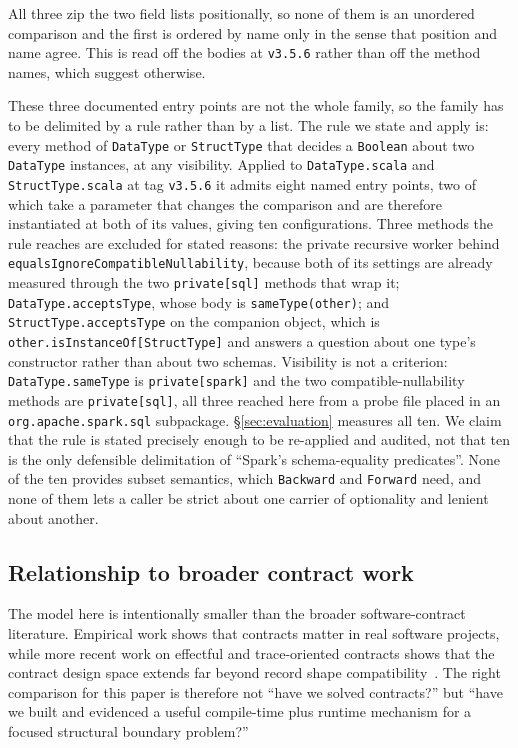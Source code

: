 All three zip the two field lists positionally, so none of them is an unordered comparison and the first is ordered by name only in the sense that position and name agree. This is read off the bodies at \texttt{v3.5.6} rather than off the method names, which suggest otherwise.


These three documented entry points are not the whole family, so the family has to be delimited by a rule rather than by a list. The rule we state and apply is: every method of \texttt{DataType} or \texttt{StructType} that decides a \texttt{Boolean} about two \texttt{DataType} instances, at any visibility. Applied to \texttt{DataType.scala} and \texttt{StructType.scala} at tag \texttt{v3.5.6} it admits eight named entry points, two of which take a parameter that changes the comparison and are therefore instantiated at both of its values, giving ten configurations. Three methods the rule reaches are excluded for stated reasons: the private recursive worker behind \texttt{equals\allowbreak Ignore\allowbreak Compatible\allowbreak Nullability}, because both of its settings are already measured through the two \texttt{private[sql]} methods that wrap it; \texttt{DataType.acceptsType}, whose body is \texttt{sameType(other)}; and \texttt{StructType.acceptsType} on the companion object, which is \texttt{other.isInstanceOf[StructType]} and answers a question about one type's constructor rather than about two schemas. Visibility is not a criterion: \texttt{DataType.sameType} is \texttt{private[spark]} and the two compatible-nullability methods are \texttt{private[sql]}, all three reached here from a probe file placed in an \texttt{org.apache.spark.sql} subpackage. \S\ref{sec:evaluation} measures all ten. We claim that the rule is stated precisely enough to be re-applied and audited, not that ten is the only defensible delimitation of ``Spark's schema-equality predicates''. None of the ten provides subset semantics, which \texttt{Backward} and \texttt{Forward} need, and none of them lets a caller be strict about one carrier of optionality and lenient about another.

\subsection{Relationship to broader contract work}

The model here is intentionally smaller than the broader software-contract literature. Empirical work shows that contracts matter in real software projects, while more recent work on effectful and trace-oriented contracts shows that the contract design space extends far beyond record shape compatibility~\cite{contracts_in_practice,effectful_software_contracts,trace_contracts}. The right comparison for this paper is therefore not ``have we solved contracts?'' but ``have we built and evidenced a useful compile-time plus runtime mechanism for a focused structural boundary problem?''

